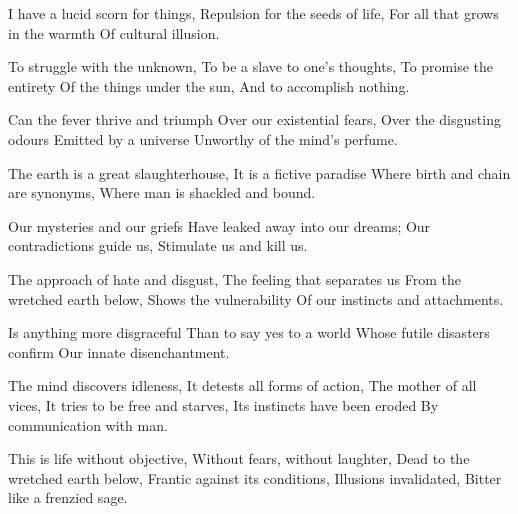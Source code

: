 \documentclass{article}
\newenvironment{stanza}{\begin{minipage}{10cm}\begin{internallinenumbers}\obeylines}{\end{internallinenumbers}\end{minipage}\vspace{\baselineskip}}
\begin{document}
\begin{stanza}
I have a lucid scorn for things,
Repulsion for the seeds of life,
For all that grows in the warmth
Of cultural illusion.
\end{stanza}

\begin{stanza}
To struggle with the unknown,
To be a slave to one's thoughts,
To promise the entirety
Of the things under the sun,
And to accomplish nothing.
\end{stanza}

\begin{stanza}
Can the fever thrive and triumph
Over our existential fears,
Over the disgusting odours
Emitted by a universe
Unworthy of the mind's perfume.
\end{stanza}

\begin{stanza}
The earth is a great slaughterhouse,
It is a fictive paradise
Where birth and chain are synonyms,
Where man is shackled and bound.
\end{stanza}

\begin{stanza}
Our mysteries and our griefs
Have leaked away into our dreams;
Our contradictions guide us,
Stimulate us and kill us.
\end{stanza}

\begin{stanza}
The approach of hate and disgust,
The feeling that separates us
From the wretched earth below,
Shows the vulnerability
Of our instincts and attachments.
\end{stanza}

\begin{stanza}
Is anything more disgraceful
Than to say yes to a world
Whose futile disasters confirm
Our innate disenchantment.
\end{stanza}

\begin{stanza}
The mind discovers idleness,
It detests all forms of action,
The mother of all vices,
It tries to be free and starves,
Its instincts have been eroded
By communication with man.
\end{stanza}

\begin{stanza}
This is life without objective,
Without fears, without laughter,
Dead to the wretched earth below,
Frantic against its conditions,
Illusions invalidated,
Bitter like a frenzied sage.
\end{stanza}
\end{document}
